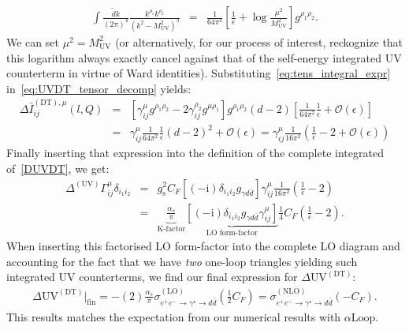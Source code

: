 \documentclass[11pt]{article}
\begin{document}
\begin{eqnarray}
\int \frac{\tilde{d} k}{(2\pi)^4} \frac{k^{\rho_1}k^{\rho_2}}{\left( k^2-M_{\textrm{UV}}^2\right)^3} &=& \frac{1}{64\pi^2}\left[ \frac{1}{\epsilon} + \log{\frac{\mu^2}{M_\textrm{UV}^2}} \right] g^{\rho_1\rho_2}. \label{eq:tens_integral_expr}
\end{eqnarray}
We can set $\mu^2=M_{\textrm{UV}}^2$ (or alternatively, for our process of interest, reckognize that this logarithm always exactly cancel against that of the self-energy integrated UV counterterm in virtue of Ward identities). Substituting~\eqref{eq:tens_integral_expr} in~\eqref{eq:UVDT_tensor_decomp} yields:
\begin{eqnarray}
\Delta\bar{I}^{(\textrm{DT}),\mu}_{ij}(l,Q) &=& \left [ \gamma^\mu_{ij} g^{\rho_1 \rho_2} -2 \gamma^{\rho_2}_{ij} g^{\mu \rho_1} \right ] g^{\rho_1\rho_2} (d-2) \left[ \frac{1}{64\pi^2} \frac{1}{\epsilon}+\mathcal{O}\left(\epsilon\right)\right] \nonumber \\
&=& \gamma^\mu_{ij}  \frac{1}{64 \pi^2} \frac{1}{\epsilon} \left( d - 2 \right)^2+\mathcal{O}\left(\epsilon\right)= \gamma^\mu_{ij}  \frac{1}{16 \pi^2} \left( \frac{1}{\epsilon} - 2 +\mathcal{O}\left(\epsilon\right) \right)
\end{eqnarray}
Finally inserting that expression into the definition of the complete integrated of~\eqref{DUVDT}, we get:
\begin{eqnarray}
\Delta^{(\textrm{UV})} \Gamma^\mu_{ij}\delta_{i_1 i_2} &=& g_\textrm{s}^2 C_F \left [ (-\textrm{i}) \delta_{i_1 i_2} g_{\gamma d\bar{d}} \right] \gamma^\mu_{ij}  \frac{1}{16 \pi^2} \left( \frac{1}{\epsilon} - 2 \right) \nonumber\\
&=& \underbrace{\frac{\alpha_s}{\pi}}_{\textrm{K-factor}} \underbrace{\left[ (-\textrm{i}) \delta_{i_1 i_2} g_{\gamma d\bar{d}} \gamma^\mu_{ij} \right]}_{\textrm{LO form-factor}} \frac{1}{4} C_F \left( \frac{1}{\epsilon} - 2 \right).
\end{eqnarray}
When inserting this factorised LO form-factor into the complete LO diagram and accounting for the fact that we have \emph{two} one-loop triangles yielding such integrated UV counterterms, we find our final expression for $\Delta \textrm{UV}^{(\textrm{DT})}$:
 \begin{eqnarray}
 \Delta \textrm{UV}^{(\textrm{DT})}\Big |_{\textrm{fin}}=-(2) \frac{\alpha_s}{\pi} \sigma^{(\textrm{LO})}_{e^+ e^-\rightarrow \gamma^\star \rightarrow d \bar{d}} \left( \frac{1}{2} C_F \right) = \sigma^{(\textrm{NLO})}_{e^+ e^-\rightarrow \gamma^\star \rightarrow d \bar{d}} \left(-C_F \right).
 \end{eqnarray}
This results matches the expectation from our numerical results with $\alpha \textrm{Loop}$.
 
\end{document}
